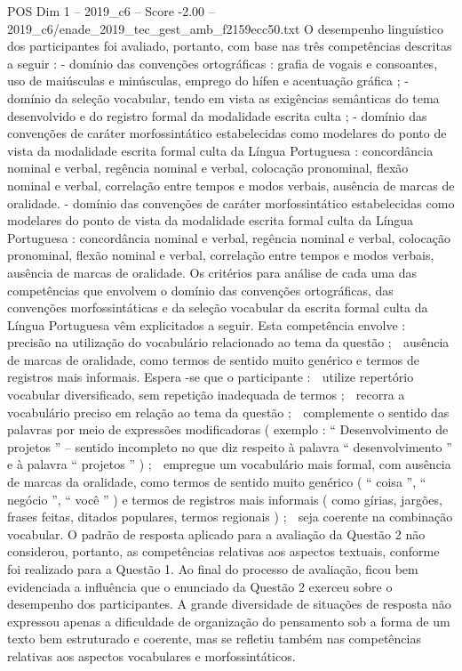 \begin{textsample}{POS Dim 1 – 2019\_c6 – Score -2.00 – 2019\_c6/enade\_2019\_tec\_gest\_amb\_f2159ecc50.txt}
O desempenho linguístico dos participantes foi avaliado, portanto, com base nas três competências descritas a seguir : - domínio das convenções ortográficas : grafia de vogais e consoantes, uso de maiúsculas e minúsculas, emprego do hífen e acentuação gráfica ; - domínio da seleção vocabular, tendo em vista as exigências semânticas do tema desenvolvido e do registro formal da modalidade escrita culta ; - domínio das convenções de caráter morfossintático estabelecidas como modelares do ponto de vista da modalidade escrita formal culta da Língua Portuguesa : concordância nominal e verbal, regência nominal e verbal, colocação pronominal, flexão nominal e verbal, correlação entre tempos e modos verbais, ausência de marcas de oralidade. - domínio das convenções de caráter morfossintático estabelecidas como modelares do ponto de vista da modalidade escrita formal culta da Língua Portuguesa : concordância nominal e verbal, regência nominal e verbal, colocação pronominal, flexão nominal e verbal, correlação entre tempos e modos verbais, ausência de marcas de oralidade.
Os critérios para análise de cada uma das competências que envolvem o domínio das convenções ortográficas, das convenções morfossintáticas e da seleção vocabular da escrita formal culta da Língua Portuguesa vêm explicitados a seguir.
Esta competência envolve :  precisão na utilização do vocabulário relacionado ao tema da questão ;  ausência de marcas de oralidade, como termos de sentido muito genérico e termos de registros mais informais.
Espera -se que o participante :  utilize repertório vocabular diversificado, sem repetição inadequada de termos ;  recorra a vocabulário preciso em relação ao tema da questão ;  complemente o sentido das palavras por meio de expressões modificadoras ( exemplo : “ Desenvolvimento de projetos ” – sentido incompleto no que diz respeito à palavra “ desenvolvimento ” e à palavra “ projetos ” ) ;  empregue um vocabulário mais formal, com ausência de marcas da oralidade, como termos de sentido muito genérico ( “ coisa ”, “ negócio ”, “ você ” ) e termos de registros mais informais ( como gírias, jargões, frases feitas, ditados populares, termos regionais ) ;  seja coerente na combinação vocabular.
O padrão de resposta aplicado para a avaliação da Questão 2 não considerou, portanto, as competências relativas aos aspectos textuais, conforme foi realizado para a Questão 1.
Ao final do processo de avaliação, ficou bem evidenciada a influência que o enunciado da Questão 2 exerceu sobre o desempenho dos participantes.
A grande diversidade de situações de resposta não expressou apenas a dificuldade de organização do pensamento sob a forma de um texto bem estruturado e coerente, mas se refletiu também nas competências relativas aos aspectos vocabulares e morfossintáticos.

\end{textsample}
